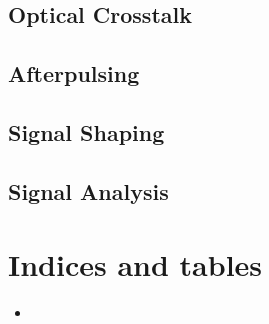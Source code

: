 \documentclass[letterpaper,10pt,english]{sphinxmanual}
\begin{document}
\section{Optical Crosstalk}
\label{\detokenize{theory:optical-crosstalk}}\label{\detokenize{theory:xttheory}}

\section{Afterpulsing}
\label{\detokenize{theory:afterpulsing}}\label{\detokenize{theory:aptheory}}

\section{Signal Shaping}
\label{\detokenize{theory:signal-shaping}}\label{\detokenize{theory:sigshapingtheory}}

\section{Signal Analysis}
\label{\detokenize{theory:signal-analysis}}\label{\detokenize{theory:signalanalysistheory}}

\chapter{Indices and tables}
\label{\detokenize{index:indices-and-tables}}\begin{itemize}
\item {} 

\end{itemize}



\renewcommand{\indexname}{Index}
\printindex
\end{document}
